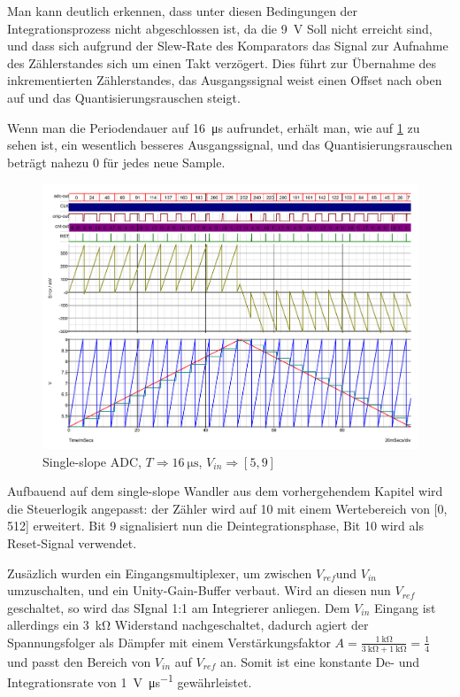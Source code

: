 \documentclass[
	ngerman,
	parskip=half,
	twocolumn,
	DIV=calc,
	]{scrartcl}
\begin{document}
		Man kann deutlich erkennen, dass unter diesen Bedingungen der Integrationsprozess nicht abgeschlossen ist, da die \SI{9}{\volt} Soll nicht erreicht sind, und dass sich aufgrund der Slew-Rate des Komparators das Signal zur Aufnahme des Zählerstandes sich um einen Takt verzögert. Dies führt zur Übernahme des inkrementierten Zählerstandes, das Ausgangssignal weist einen Offset nach oben auf und das Quantisierungsrauschen steigt.
		
		Wenn man die Periodendauer auf \SI{16}{\micro\second} aufrundet, erhält man, wie auf \cref{fig:single-slope-ideal} zu sehen ist, ein wesentlich besseres Ausgangssignal, und das Quantisierungsrauschen beträgt nahezu 0 für jedes neue Sample. 
		
		\begin{figure}[h!]
			\centering
			\includegraphics[width=\linewidth]{ideal_single_slope}
			\caption[Single-slope ADC (T = \SI{16}{\micro\second})]{Single-slope ADC, $T \Rightarrow \SI{16}{\micro\second}$, $V_{in} \Rightarrow [5,  9]$}
			\label{fig:single-slope-ideal}
		\end{figure}
		
		
		\label{sec:dual-slope-adc}
		
		Aufbauend auf dem single-slope Wandler aus dem vorhergehendem Kapitel wird die Steuerlogik angepasst: der Zähler wird auf \SI{10}{\bit} mit einem Wertebereich von [0, 512] erweitert. Bit 9 signalisiert nun die Deintegrationsphase, Bit 10 wird als Reset-Signal verwendet.
				
		Zusäzlich wurden ein Eingangsmultiplexer, um zwischen $V_{ref} $und $V_{in} $ umzuschalten, und ein Unity-Gain-Buffer verbaut.
		Wird an diesen nun $V_{ref} $ geschaltet, so wird das SIgnal 1:1 am Integrierer anliegen. Dem $V_{in}$ Eingang ist allerdings ein \SI{3}{\kilo\ohm} Widerstand nachgeschaltet, dadurch agiert der  Spannungsfolger als Dämpfer mit einem Verstärkungsfaktor $ A = \frac{\SI{1}{\kilo\ohm}}{\SI{3}{\kilo\ohm} + \SI{1}{\kilo\ohm}} = \frac{1}{4}$ und passt den Bereich von $V_{in} $ auf $V_{ref} $ an. Somit ist eine konstante De- und Integrationsrate von \SI{1}{\volt\per\micro\second} gewährleistet.
		
\end{document}
